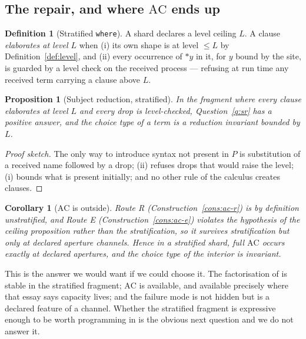 \documentclass[11pt]{article}
\theoremstyle{definition}
\newtheorem{definition}{Definition}
\theoremstyle{plain}
\newtheorem{proposition}{Proposition}
\newtheorem{corollary}{Corollary}
\theoremstyle{remark}
\newcommand{\AC}{\mathrm{AC}}
\begin{document}
\subsection{The repair, and where $\AC$ ends up}

\begin{definition}[Stratified \texttt{where}]\label{def:strat}
A shard declares a level ceiling $L$. A clause \emph{elaborates at level $L$} when
(i) its own shape is at level $\leq L$ by Definition~\ref{def:level}, and (ii) every
occurrence of $*y$ in it, for $y$ bound by the site, is guarded by a level check on the
received process --- refusing at run time any received term carrying a clause above
$L$.
\end{definition}

\begin{proposition}[Subject reduction, stratified]\label{prop:srholds}
In the fragment where every clause elaborates at level $L$ and every drop is
level-checked, Question~\ref{q:sr} has a positive answer, and the choice type of a term
is a reduction invariant bounded by $L$.
\end{proposition}

\begin{proof}[Proof sketch]
The only way to introduce syntax not present in $P$ is substitution of a received name
followed by a drop; (ii) refuses drops that would raise the level; (i) bounds what is
present initially; and no other rule of the calculus creates clauses.
\end{proof}

\begin{corollary}[$\AC$ is outside]\label{cor:acoutside}
Route R (Construction~\ref{cons:ac-r}) is by definition unstratified, and Route E
(Construction~\ref{cons:ac-e}) violates the hypothesis of the ceiling proposition
rather than the stratification, so it survives stratification but only at declared
aperture channels. Hence in a stratified shard, full $\AC$ occurs exactly at declared
apertures, and the choice type of the interior is invariant.
\end{corollary}

\noindent
This is the answer we would want if we could choose it. The factorisation of
\cite{agency} is stable in the stratified fragment; $\AC$ is available, and available
precisely where that essay says capacity lives; and the failure mode is not hidden but
is a declared feature of a channel. Whether the stratified fragment is expressive
enough to be worth programming in is the obvious next question and we do not answer it.
\end{document}
